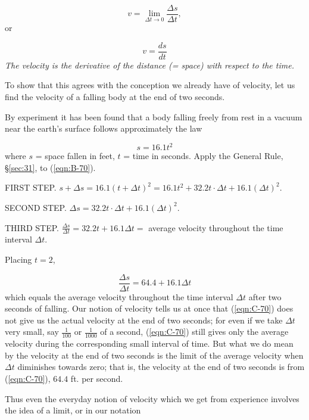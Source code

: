 \[
  	v = \lim_{\Delta t \to 0} \frac{\Delta s}{\Delta t},
\]
or

\begin{equation}
v = \frac{ds}{dt}
\label{eqn:9-70}
\end{equation}	
{\it The velocity is the derivative of the distance (= space) with respect to the time.}

To show that this agrees with the conception we already have 
of velocity, let us find the velocity of a falling body at the end of two seconds.

By experiment it has been found that a body falling freely from 
rest in a vacuum near the earth's surface follows approximately the law

\begin{equation}
s = 16.1t^2
\label{eqn:B-70}
\end{equation}	
where $s$ = space fallen in feet, $t$ = time in seconds. 
Apply the General Rule, \S \ref{sec:31}, %
to (\ref{eqn:B-70}).

FIRST STEP. 	
$s + \Delta s = 16.1(t + \Delta t)^2 
= 16.1 t^2 + 32.2 t \cdot \Delta t + 16.1(\Delta t)^2$.

SECOND STEP. 	
$\Delta s 	= 32.2t \cdot \Delta t + 16.1(\Delta t)^2$.

THIRD STEP. 
$\frac{\Delta s}{\Delta t}
= 32.2t + 16.1\Delta t = $ average velocity throughout the time interval $\Delta t$.

Placing $t = 2$,

\begin{equation}
\frac{\Delta s}{\Delta t} 	= 64.4 + 16.1\Delta t 
\label{eqn:C-70}
\end{equation}	
which equals the average velocity throughout the time 
interval $\Delta t$ after two seconds of falling.
Our notion of velocity tells us at once that (\ref{eqn:C-70}) does not give us 
the actual velocity at the end of two seconds; for even if we take 
$\Delta t$ very small, say $\frac{1}{100}$ or $\frac{1}{1000}$ of a second, 
(\ref{eqn:C-70}) still gives only the average velocity during the corresponding 
small interval of time. But what we do mean by the velocity at the 
end of two seconds is the limit of the average velocity when $\Delta t$ 
diminishes towards zero; that is, the velocity at the end of two 
seconds is from (\ref{eqn:C-70}), $64.4$ ft. per second.

Thus even the everyday notion of velocity which we get from 
experience involves the idea of a limit, or in our notation

